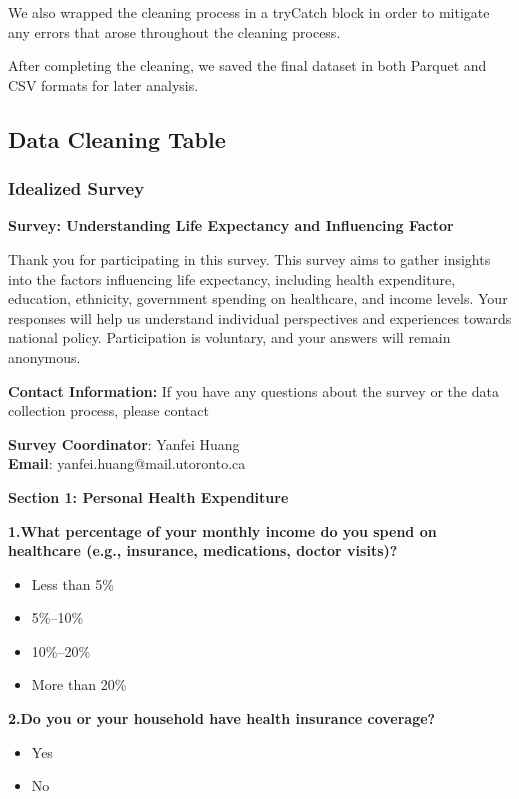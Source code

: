 \documentclass[
  letterpaper,
  DIV=11,
  numbers=noendperiod]{scrartcl}
\providecommand{\tightlist}{%
  \setlength{\itemsep}{0pt}\setlength{\parskip}{0pt}}\usepackage{longtable,booktabs,array}
\begin{document}
We also wrapped the cleaning process in a tryCatch block in order to
mitigate any errors that arose throughout the cleaning process.

After completing the cleaning, we saved the final dataset in both
Parquet and CSV formats for later analysis.

\subsection{Data Cleaning Table}\label{data-cleaning-table}

\subsubsection{Idealized Survey}\label{idealized-survey}

\textbf{Survey: Understanding Life Expectancy and Influencing Factor}

Thank you for participating in this survey. This survey aims to gather
insights into the factors influencing life expectancy, including health
expenditure, education, ethnicity, government spending on healthcare,
and income levels. Your responses will help us understand individual
perspectives and experiences towards national policy. Participation is
voluntary, and your answers will remain anonymous.

\textbf{Contact Information:} If you have any questions about the survey
or the data collection process, please contact

\textbf{Survey Coordinator}: Yanfei Huang\\
\textbf{Email}: yanfei.huang@mail.utoronto.ca

\textbf{Section 1: Personal Health Expenditure}

\textbf{1.What percentage of your monthly income do you spend on
healthcare (e.g., insurance, medications, doctor visits)?}

\begin{itemize}
\tightlist
\item
  Less than 5\%
\item
  5\%--10\%
\item
  10\%--20\%
\item
  More than 20\%
\end{itemize}

\textbf{2.Do you or your household have health insurance coverage?}

\begin{itemize}
\tightlist
\item
  Yes
\item
  No
\end{itemize}
\end{document}
